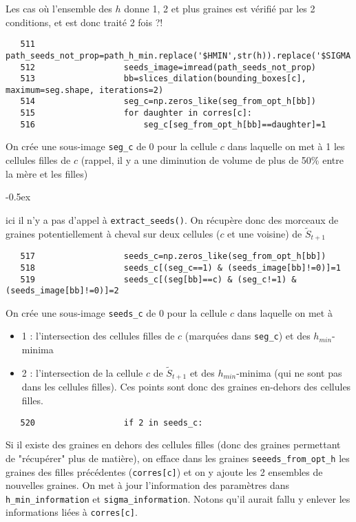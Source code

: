 \documentclass{article}
\def \mycolor {red}
\begin{document}
Les cas o\`u l'ensemble des $h$ donne 1, 2 et plus graines est v\'erifi\'e par les 2 conditions, et est donc trait\'e 2 fois ?!
\color{black}
\begin{verbatim} 
   511	                path_seeds_not_prop=path_h_min.replace('$HMIN',str(h)).replace('$SIGMA',str(sigma));
   512	                seeds_image=imread(path_seeds_not_prop)
   513	                bb=slices_dilation(bounding_boxes[c], maximum=seg.shape, iterations=2)
   514	                seg_c=np.zeros_like(seg_from_opt_h[bb])
   515	                for daughter in corres[c]:
   516	                    seg_c[seg_from_opt_h[bb]==daughter]=1
\end{verbatim} 
\color{\mycolor}
On cr\'ee une sous-image \verb|seg_c| de 0 pour la cellule $c$ dans laquelle on met \`a 1 les cellules filles de $c$ (rappel, il y a une diminution de volume de plus de 50\% entre la m\`ere et les filles) 
\begin{description}
\itemsep -0.5ex
\item[ATTENTION :] ici il n'y a pas d'appel \`a \verb|extract_seeds()|. On r\'ecup\`ere donc des morceaux de graines potentiellement \`a cheval sur deux cellules ($c$ et une voisine)  de $\tilde{S}_{t+1}$
\end{description}
\color{black}
\begin{verbatim} 
   517	                seeds_c=np.zeros_like(seg_from_opt_h[bb])
   518	                seeds_c[(seg_c==1) & (seeds_image[bb]!=0)]=1
   519	                seeds_c[(seg[bb]==c) & (seg_c!=1) & (seeds_image[bb]!=0)]=2
\end{verbatim} 
\color{\mycolor}
On cr\'ee une sous-image \verb|seeds_c| de 0 pour la cellule $c$ dans laquelle on met \`a 
\begin{itemize}
\itemsep -0.5ex
\item 1 : l'intersection des cellules filles de $c$ (marqu\'ees dans \verb|seg_c|) et des $h_{min}$-minima
\item 2  : l'intersection de la cellule $c$ de $\tilde{S}_{t+1}$ et des $h_{min}$-minima (qui ne sont pas dans les cellules filles). Ces points sont donc des graines en-dehors des cellules filles.
\end{itemize}
\color{black}
\begin{verbatim} 
   520	                if 2 in seeds_c:
\end{verbatim} 
\color{\mycolor}
Si il existe des graines en dehors des cellules filles (donc des graines permettant de "r\'ecup\'erer" plus de mati\`ere),
on efface dans les graines  \verb|seeeds_from_opt_h| les graines des filles pr\'ec\'edentes (\verb|corres[c]|) et on y ajoute les 2 ensembles de nouvelles graines. On met \`a jour l'information des param\`etres dans \verb|h_min_information| et \verb|sigma_information|. Notons qu'il aurait fallu y enlever les informations li\'ees \`a \verb|corres[c]|.
\end{document}
